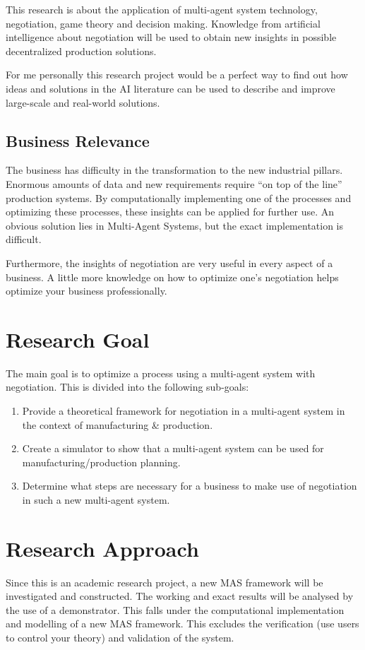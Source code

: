 This research is about the application of multi-agent system technology, negotiation, game theory and decision making. Knowledge from artificial intelligence about negotiation will be used to obtain new insights in possible decentralized production solutions.

For me personally this research project would be a perfect way to find out how ideas and solutions in the AI literature can be used to describe and improve large-scale and real-world solutions.
\subsection{Business Relevance}
The business has difficulty in the transformation to the new industrial pillars. Enormous amounts of data and new requirements require ``on top of the line'' production systems. By computationally implementing one of the processes and optimizing these processes, these insights can be applied for further use. An obvious solution lies in Multi-Agent Systems, but the exact implementation is difficult.

Furthermore, the insights of negotiation are very useful in every aspect of a business. A little more knowledge on how to optimize one's negotiation helps optimize your business professionally.
\section{Research Goal}
The main goal is to optimize a process using a multi-agent system with negotiation. This is divided into the following sub-goals:
\begin{enumerate}
	\item
	Provide a theoretical framework for negotiation in a multi-agent system in the context of manufacturing \& production.
	\item
	Create a simulator to show that a multi-agent system can be used for manufacturing/production planning.
	\item
	Determine what steps are necessary for a business to make use of negotiation in such a new multi-agent system. 
\end{enumerate} 


\section{Research Approach}
\label{sec:researchapproach}
Since this is an academic research project, a new MAS framework will be investigated and constructed. The working and exact results will be analysed by the use of a demonstrator. This falls under the computational implementation and modelling of a new MAS framework. This excludes the verification (use users to control your theory) and validation of the system.

